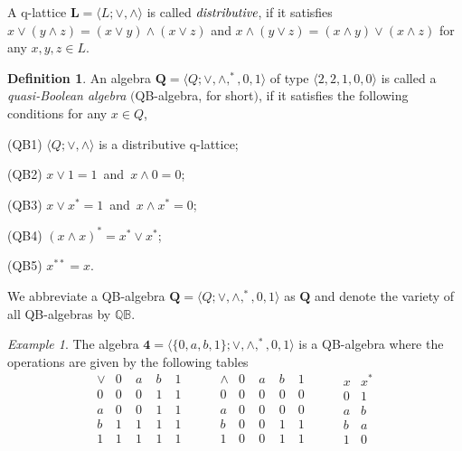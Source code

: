 \documentclass[12pt]{amsart}
\theoremstyle{definition}
\newtheorem{definition}{Definition}[section]
\theoremstyle{remark}
\newtheorem{example}{Example}[section]
\numberwithin{equation}{section}
\begin{document}
A q-lattice $\mathbf{L}=\langle L; \vee,\wedge \rangle$ is called $\emph{distributive}$, if it satisfies $ x\vee (y\wedge z)=(x\vee y)\wedge (x\vee z)$ and $ x\wedge (y\vee z)=(x\wedge y)\vee (x\wedge z)$ for any $x,y,z\in L$.

\begin{definition}\label{Definition 3}\cite{Engineering}
An algebra $\mathbf{Q} = \langle Q ; \vee ,\wedge ,^\ast, 0, 1 \rangle$ of type $\langle 2,2,1,0,0\rangle $ is called a \emph{quasi-Boolean algebra} $\mathrm{(}$QB-algebra, for short$\mathrm{)}$, if it satisfies the following conditions for any $x\in Q$,

(QB1) $\langle Q;\vee,\wedge\rangle $ is a distributive q-lattice;

(QB2) $x\vee1=1$ \,and\, $x \wedge0=0$;

(QB3) $x\vee x^{*}=1$ \,and\, $x\wedge x^{*}=0$;

(QB4) $(x\wedge x)^{*}=x^{*}\vee x^{*}$;

(QB5) $x^{**}= x$.
\end{definition}

We abbreviate a QB-algebra $\mathbf{Q} = \langle Q ; \vee ,\wedge ,^\ast, 0, 1 \rangle$ as $\mathbf{Q}$ and denote the variety of all QB-algebras by $\mathbb{QB}$.



\begin{example}\label{Example 4}\cite{QB}
The algebra $\mathbf{4} = \langle \{0,a,b,1\} ; \vee ,\wedge ,^\ast, 0, 1 \rangle$ is a QB-algebra where the operations are given by the following tables\\
$$
\begin{array}{c|cccccc} \vee & 0\; & a\; & b\; & 1\;  \\ \hline 0 & 0 & 0 & 1 & 1 \\ a & 0 & 0 & 1 & 1 \\ b& 1 & 1 & 1 & 1 \\ 1 & 1 & 1 & 1 & 1 \end{array}\qquad
\begin{array}{c|cccccc} \wedge & 0\; & a\; & b\; & 1\;  \\ \hline 0 & 0 & 0 & 0 & 0 \\ a & 0 & 0 & 0 & 0 \\ b& 0 & 0 & 1 & 1 \\ 1 & 0 & 0 & 1 & 1 \end{array}\qquad
\begin{array}{c|cccccc} x & x^{*}   \\ \hline 0 & 1 \\ a & b \\ b& a \\ 1 & 0 \end{array}
$$
\end{example}
\end{document}
